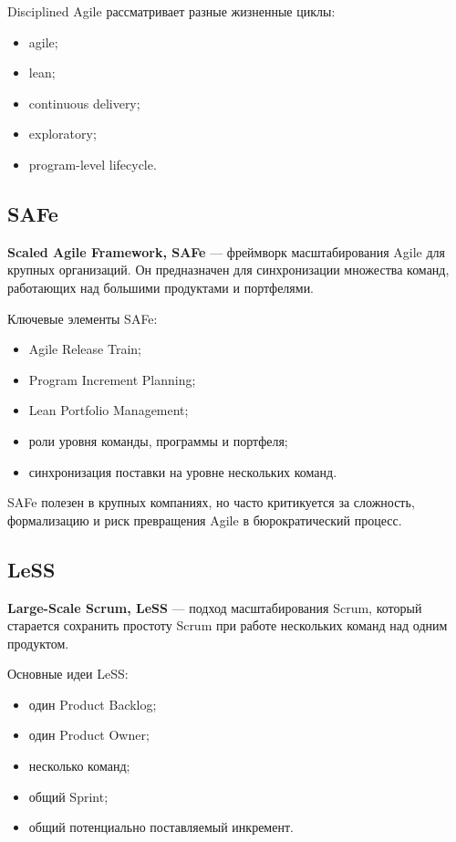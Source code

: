 \documentclass[12pt,a4paper]{article}
\begin{document}
Disciplined Agile рассматривает разные жизненные циклы:
\begin{itemize}
    \item agile;
    \item lean;
    \item continuous delivery;
    \item exploratory;
    \item program-level lifecycle.
\end{itemize}

\subsection{SAFe}

\textbf{Scaled Agile Framework, SAFe} --- фреймворк масштабирования Agile для крупных организаций. Он предназначен для синхронизации множества команд, работающих над большими продуктами и портфелями.

Ключевые элементы SAFe:
\begin{itemize}
    \item Agile Release Train;
    \item Program Increment Planning;
    \item Lean Portfolio Management;
    \item роли уровня команды, программы и портфеля;
    \item синхронизация поставки на уровне нескольких команд.
\end{itemize}

SAFe полезен в крупных компаниях, но часто критикуется за сложность, формализацию и риск превращения Agile в бюрократический процесс.

\subsection{LeSS}

\textbf{Large-Scale Scrum, LeSS} --- подход масштабирования Scrum, который старается сохранить простоту Scrum при работе нескольких команд над одним продуктом.

Основные идеи LeSS:
\begin{itemize}
    \item один Product Backlog;
    \item один Product Owner;
    \item несколько команд;
    \item общий Sprint;
    \item общий потенциально поставляемый инкремент.
\end{itemize}
\end{document}
